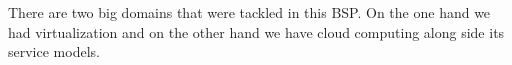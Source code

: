 There are two big domains that were tackled in this BSP. On the one
hand we had virtualization and on the other hand we have cloud
computing along side its service models. 

